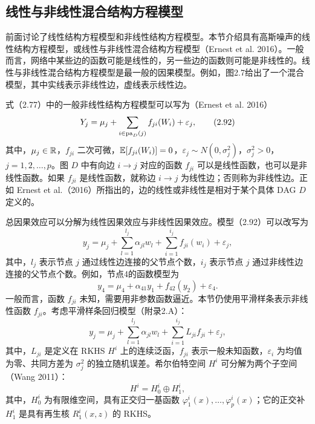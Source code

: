 \subsection{线性与非线性混合结构方程模型}

前面讨论了线性结构方程模型和非线性结构方程模型。本节介绍具有高斯噪声的线性结构方程模型，或线性与非线性混合结构方程模型（Ernest et al. 2016）。一般而言，网络中某些边的函数可能是线性的，另一些边的函数则可能是非线性的。线性与非线性混合结构方程模型是最一般的因果模型。例如，图2.7给出了一个混合模型，其中实线表示非线性边，虚线表示线性边。
\begin{figure}[htbp]
\centering
{}
\end{figure}
式（2.77）中的一般非线性结构方程模型可以写为（Ernest et al. 2016）
\begin{equation}
Y_j=\mu_j+\sum_{i\in\mathrm{pa}_D(j)}f_{ji}(W_i)+\varepsilon_j,
\tag{2.92}
\end{equation}
其中，$\mu_j\in\mathbb{R}$，$f_{ji}$ 二次可微，$\mathbb{E}[f_{ji}(W_i)]=0$，$\varepsilon_j\sim N(0,\sigma_j^2)$，$\sigma_j^2>0$，$j=1,2,\ldots,p$。图 $D$ 中有向边 $i\to j$ 对应的函数 $f_{ji}$ 可以是线性函数，也可以是非线性函数。如果 $f_{ji}$ 是线性函数，就称边 $i\to j$ 为线性边；否则称为非线性边。正如 Ernest et al.（2016）所指出的，边的线性或非线性是相对于某个具体 DAG $D$ 定义的。

总因果效应可以分解为线性因果效应与非线性因果效应。模型（2.92）可以改写为
\begin{equation}
y_j=\mu_j+\sum_{l=1}^{l_j}\alpha_{jl}w_l
+\sum_{i=1}^{i_j}f_{ji}(w_i)+\varepsilon_j,
\tag{2.93}
\end{equation}
其中，$l_j$ 表示节点 $j$ 通过线性边连接的父节点个数，$i_j$ 表示节点 $j$ 通过非线性边连接的父节点个数。例如，节点4的函数模型为
\[
y_4=\mu_4+\alpha_{41}y_1+f_{42}(y_2)+\varepsilon_4.
\]
一般而言，函数 $f_{ji}$ 未知，需要用非参数函数逼近。本节仍使用平滑样条表示非线性函数 $f_{ji}$。考虑平滑样条回归模型（附录2.A）：
\begin{equation}
y_j=\mu_j+\sum_{l=1}^{l_j}\alpha_{jl}w_l
+\sum_{i=1}^{i_j}L_{ji}f_{ji}+\varepsilon_j,
\tag{2.94}
\end{equation}
其中，$L_{ji}$ 是定义在 RKHS $H^i$ 上的连续泛函，$f_{ji}$ 表示一般未知函数，$\varepsilon_i$ 为均值为零、共同方差为 $\sigma_j^2$ 的独立随机误差。希尔伯特空间 $H^i$ 可分解为两个子空间（Wang 2011）：
\[
H^i=H_0^i\oplus H_1^i,
\]
其中，$H_0^i$ 为有限维空间，具有正交归一基函数 $\varphi_1^i(x),\ldots,\varphi_p^i(x)$；它的正交补 $H_1^i$ 是具有再生核 $R_1^i(x,z)$ 的 RKHS。

